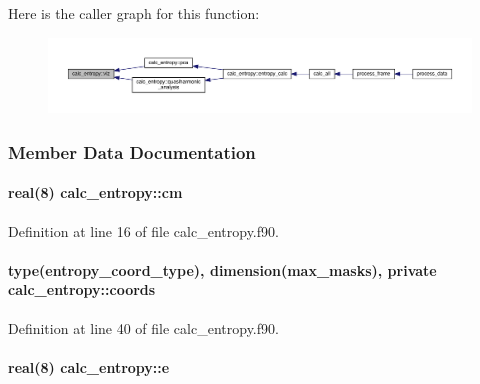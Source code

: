 Here is the caller graph for this function\-:
\nopagebreak
\begin{figure}[H]
\begin{center}
\leavevmode
\includegraphics[width=350pt]{classcalc__entropy_ab1305be69ef87d449d6e0a83f557ef80_icgraph}
\end{center}
\end{figure}




\subsubsection{Member Data Documentation}
\hypertarget{classcalc__entropy_a849ddf2db70a1dd6e4098d51b05f195f}{
\paragraph[{cm}]{\setlength{\rightskip}{0pt plus 5cm}real(8) calc\-\_\-entropy\-::cm}}\label{classcalc__entropy_a849ddf2db70a1dd6e4098d51b05f195f}


Definition at line 16 of file calc\-\_\-entropy.\-f90.

\hypertarget{classcalc__entropy_a146c2e38467ec52f4c216e2a18b5aaa1}{
\paragraph[{coords}]{\setlength{\rightskip}{0pt plus 5cm}type({\bf entropy\-\_\-coord\-\_\-type}), dimension(max\-\_\-masks), private calc\-\_\-entropy\-::coords\hspace{0.3cm}{\ttfamily [private]}}}\label{classcalc__entropy_a146c2e38467ec52f4c216e2a18b5aaa1}


Definition at line 40 of file calc\-\_\-entropy.\-f90.

\hypertarget{classcalc__entropy_ae17fb9f97d704cb0eb48b1c7b7b0ccaa}{
\paragraph[{e}]{\setlength{\rightskip}{0pt plus 5cm}real(8) calc\-\_\-entropy\-::e}}\label{classcalc__entropy_ae17fb9f97d704cb0eb48b1c7b7b0ccaa}


